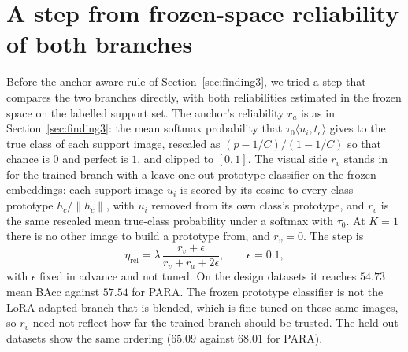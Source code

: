 \section{A step from frozen-space reliability of both branches}\label{app:reliability}

Before the anchor-aware rule of Section~\ref{sec:finding3}, we tried a step that compares the two branches directly,
with both reliabilities estimated in the frozen space on the labelled support set.
The anchor's reliability $r_a$ is as in Section~\ref{sec:finding3}: the mean softmax probability that $\tau_0 \langle u_i, t_c \rangle$
gives to the true class of each support image, rescaled as $(p - 1/C)/(1 - 1/C)$ so that chance is $0$ and perfect is $1$, and clipped to $[0, 1]$.
The visual side $r_v$ stands in for the trained branch with a leave-one-out prototype classifier on the frozen embeddings:
each support image $u_i$ is scored by its cosine to every class prototype $h_c / \lVert h_c \rVert$,
with $u_i$ removed from its own class's prototype, and $r_v$ is the same rescaled mean true-class probability under a softmax with $\tau_0$.
At $K = 1$ there is no other image to build a prototype from, and $r_v = 0$.
The step is
\begin{equation}
  \eta_{\text{rel}} = \lambda\,\frac{r_v + \epsilon}{r_v + r_a + 2\epsilon}, \qquad \epsilon = 0.1,
\end{equation}
with $\epsilon$ fixed in advance and not tuned.
On the design datasets it reaches $54.73$ mean BAcc against $57.54$ for PARA.
The frozen prototype classifier is not the LoRA-adapted branch that is blended, which is fine-tuned on these same images,
so $r_v$ need not reflect how far the trained branch should be trusted.
The held-out datasets show the same ordering ($65.09$ against $68.01$ for PARA).
